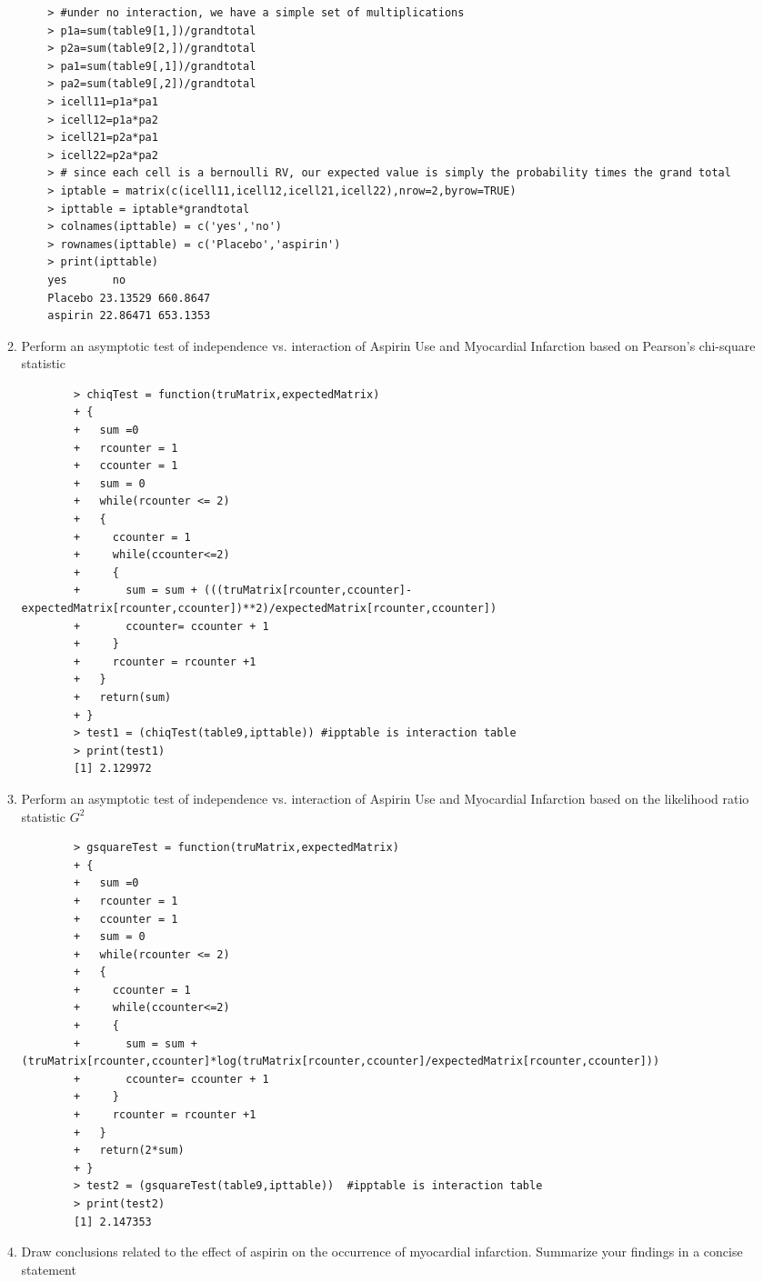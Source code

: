 \documentclass[11pt]{article}
\begin{document}
\begin{enumerate}
\begin{enumerate}
\begin{verbatim}
	> #under no interaction, we have a simple set of multiplications
	> p1a=sum(table9[1,])/grandtotal
	> p2a=sum(table9[2,])/grandtotal
	> pa1=sum(table9[,1])/grandtotal
	> pa2=sum(table9[,2])/grandtotal
	> icell11=p1a*pa1
	> icell12=p1a*pa2
	> icell21=p2a*pa1
	> icell22=p2a*pa2
	> # since each cell is a bernoulli RV, our expected value is simply the probability times the grand total
	> iptable = matrix(c(icell11,icell12,icell21,icell22),nrow=2,byrow=TRUE)
	> ipttable = iptable*grandtotal
	> colnames(ipttable) = c('yes','no')
	> rownames(ipttable) = c('Placebo','aspirin')
	> print(ipttable)
	yes       no
	Placebo 23.13529 660.8647
	aspirin 22.86471 653.1353
	\end{verbatim}
	\item Perform an asymptotic test of independence vs. interaction of Aspirin Use and Myocardial Infarction based on Pearson’s chi-square statistic
	\begin{verbatim}
		> chiqTest = function(truMatrix,expectedMatrix)
		+ {
		+   sum =0
		+   rcounter = 1
		+   ccounter = 1
		+   sum = 0
		+   while(rcounter <= 2)
		+   {
		+     ccounter = 1
		+     while(ccounter<=2)
		+     {
		+       sum = sum + (((truMatrix[rcounter,ccounter]-expectedMatrix[rcounter,ccounter])**2)/expectedMatrix[rcounter,ccounter])
		+       ccounter= ccounter + 1
		+     }
		+     rcounter = rcounter +1
		+   }
		+   return(sum)
		+ }
		> test1 = (chiqTest(table9,ipttable)) #ipptable is interaction table
		> print(test1)
		[1] 2.129972
	\end{verbatim}
	\item Perform an asymptotic test of independence vs. interaction of Aspirin Use and Myocardial Infarction based on the likelihood ratio statistic $G^2$
	\begin{verbatim}
		> gsquareTest = function(truMatrix,expectedMatrix)
		+ {
		+   sum =0
		+   rcounter = 1
		+   ccounter = 1
		+   sum = 0
		+   while(rcounter <= 2)
		+   {
		+     ccounter = 1
		+     while(ccounter<=2)
		+     {
		+       sum = sum + (truMatrix[rcounter,ccounter]*log(truMatrix[rcounter,ccounter]/expectedMatrix[rcounter,ccounter]))
		+       ccounter= ccounter + 1
		+     }
		+     rcounter = rcounter +1
		+   }
		+   return(2*sum)
		+ }
		> test2 = (gsquareTest(table9,ipttable))  #ipptable is interaction table
		> print(test2)
		[1] 2.147353
	\end{verbatim}
	\item Draw conclusions related to the effect of aspirin on the occurrence of myocardial infarction. Summarize your findings in a concise statement\\

\end{enumerate}
\end{enumerate}
\end{document}
